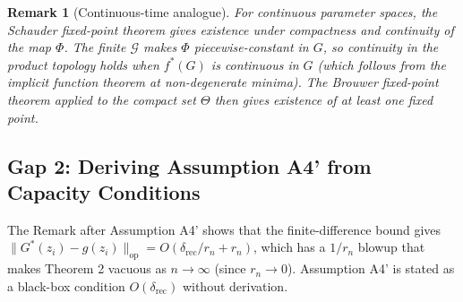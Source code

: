 \documentclass[11pt]{article}
\newtheorem{remark}{Remark}
\begin{document}
\begin{bridgebox}
\begin{remark}[Continuous-time analogue]
For continuous parameter spaces, the Schauder fixed-point theorem gives existence
under compactness and continuity of the map $\Phi$. The finite $\mathcal{G}$ makes
$\Phi$ piecewise-constant in $G$, so continuity in the product topology holds
when $f^*(G)$ is continuous in $G$ (which follows from the implicit function
theorem at non-degenerate minima). The Brouwer fixed-point theorem applied to
the compact set $\Theta$ then gives existence of at least one fixed point.
\end{remark}
\end{bridgebox}

\subsection{Gap 2: Deriving Assumption A4' from Capacity Conditions}

\begin{gapbox}
The Remark after Assumption A4' shows that the finite-difference bound gives
$\|G^*(z_i) - g(z_i)\|_{\mathrm{op}} = O(\delta_{\mathrm{rec}}/r_n + r_n)$,
which has a $1/r_n$ blowup that makes Theorem 2 vacuous as $n \to \infty$
(since $r_n \to 0$). Assumption A4' is stated as a black-box condition
$O(\delta_{\mathrm{rec}})$ without derivation.
\end{gapbox}
\end{document}
